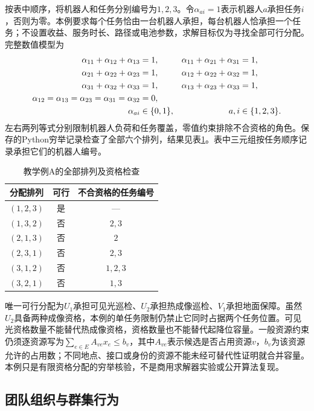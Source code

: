 按表中顺序，将机器人和任务分别编号为$1,2,3$。令$\alpha_{ai}=1$表示机器人$a$承担任务$i$，否则为零。本例要求每个任务恰由一台机器人承担，每台机器人恰承担一个任务；不设置收益、服务时长、路径或电池参数，求解目标仅为寻找全部可行分配。完整数值模型为
\begin{align}
\alpha_{11}+\alpha_{12}+\alpha_{13}&=1, &
\alpha_{11}+\alpha_{21}+\alpha_{31}&=1,\notag\\
\alpha_{21}+\alpha_{22}+\alpha_{23}&=1, &
\alpha_{12}+\alpha_{22}+\alpha_{32}&=1,\notag\\
\alpha_{31}+\alpha_{32}+\alpha_{33}&=1, &
\alpha_{13}+\alpha_{23}+\alpha_{33}&=1,\notag\\
\alpha_{12}=\alpha_{13}=\alpha_{23}
=\alpha_{31}=\alpha_{32}&=0,\notag\\
\alpha_{ai}&\in\{0,1\}, & a,i&\in\{1,2,3\}.
\label{s0106:example_model}
\end{align}
左右两列等式分别限制机器人负荷和任务覆盖，零值约束排除不合资格的角色。保存的Python穷举记录检查了全部六个排列，结果见表\ref{s0106:enumeration}。表中三元组按任务顺序记录承担它们的机器人编号。
\begin{table}[htbp]
\centering
\caption{教学例A的全部排列及资格检查}
\label{s0106:enumeration}
\begin{tabular}{ccc}
\toprule
分配排列 & 可行 & 不合资格的任务编号 \\
\midrule
$(1,2,3)$ & 是 & --- \\
$(1,3,2)$ & 否 & $2,3$ \\
$(2,1,3)$ & 否 & $2$ \\
$(2,3,1)$ & 否 & $2,3$ \\
$(3,1,2)$ & 否 & $1,2,3$ \\
$(3,2,1)$ & 否 & $1,3$ \\
\bottomrule
\end{tabular}
\end{table}

唯一可行分配为$U_1$承担可见光巡检、$U_2$承担热成像巡检、$V_1$承担地面保障。虽然$U_2$具备两种成像资格，本例的单任务限制仍禁止它同时占据两个任务位置。可见光资格数量不能替代热成像资格，资格数量也不能替代起降位容量。一般资源约束仍须逐资源写为$\sum_{e\in E}A_{ve}x_e\le b_v$，其中$A_{ve}$表示候选是否占用资源$v$，$b_v$为该资源允许的占用数；不同地点、接口或身份的资源不能未经可替代性证明就合并容量。本例只是有限资格分配的穷举核验，不是商用求解器实验或公开算法复现。

\subsection{团队组织与群集行为}

